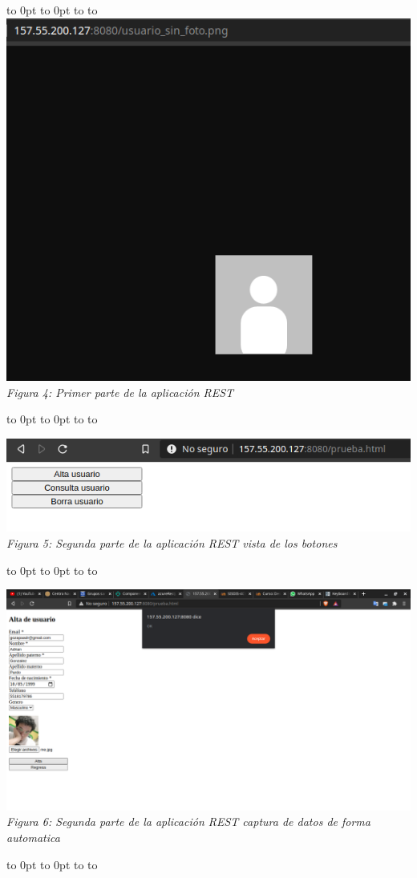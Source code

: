 \documentclass[10pt,executivepaper]{article}
\def\fillandplacepagenumber{%
 \par\pagestyle{empty}%
 \vbox to 0pt{\vss}\vfill
 \vbox to 0pt{\baselineskip0pt
   \hbox to\linewidth{\hss}%
   \baselineskip\footskip
   \hbox to\linewidth{%
     \hfil\thepage\hfil}\vss}}
\begin{document}
\begin{center}
\begin{landscape}
    \fillandplacepagenumber
    \includegraphics[scale=0.5]{imgs/rest_image.png}
    \\\textit{Figura 4: Primer parte de la aplicación REST}
    \fillandplacepagenumber

    \includegraphics[scale=0.5]{imgs/html.png}
    \\\textit{Figura 5: Segunda parte de la aplicación REST vista de los botones}
    \fillandplacepagenumber

    \includegraphics[scale=0.45]{imgs/ventana-captura.png}
    \\\textit{Figura 6: Segunda parte de la aplicación REST captura de datos de forma automatica}
    \fillandplacepagenumber


\end{landscape}
\end{center}
\end{document}
